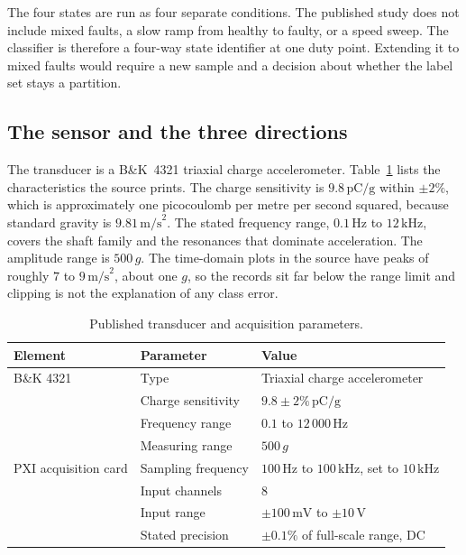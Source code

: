 The four states are run as four separate conditions.
The published study does not include mixed faults, a slow ramp from healthy to faulty, or a speed sweep.
The classifier is therefore a four-way state identifier at one duty point.
Extending it to mixed faults would require a new sample and a decision about whether the label set stays a partition.

\subsection{The sensor and the three directions}

The transducer is a B\&K~4321 triaxial charge accelerometer.
Table~\ref{tab:sensor} lists the characteristics the source prints.
The charge sensitivity is \(9.8\,\mathrm{pC/g}\) within \(\pm 2\%\), which is approximately one picocoulomb per metre per second squared, because standard gravity is \(9.81\,\mathrm{m/s}^{2}\).
The stated frequency range, \(0.1\,\mathrm{Hz}\) to \(12\,\mathrm{kHz}\), covers the shaft family and the resonances that dominate acceleration.
The amplitude range is \(500\,g\).
The time-domain plots in the source have peaks of roughly \(7\) to \(9\,\mathrm{m/s}^{2}\), about one \(g\), so the records sit far below the range limit and clipping is not the explanation of any class error.

\begin{table}[H]
\centering
\caption{Published transducer and acquisition parameters.}
\label{tab:sensor}
\begin{tabular}{lll}
\toprule
Element & Parameter & Value \\
\midrule
B\&K 4321 & Type & Triaxial charge accelerometer \\
 & Charge sensitivity & \(9.8\pm 2\%\,\mathrm{pC/g}\) \\
 & Frequency range & \(0.1\) to \(12\,000\,\mathrm{Hz}\) \\
 & Measuring range & \(500\,g\) \\
\midrule
PXI acquisition card & Sampling frequency & \(100\,\mathrm{Hz}\) to \(100\,\mathrm{kHz}\), set to \(10\,\mathrm{kHz}\) \\
 & Input channels & \(8\) \\
 & Input range & \(\pm 100\,\mathrm{mV}\) to \(\pm 10\,\mathrm{V}\) \\
 & Stated precision & \(\pm 0.1\%\) of full-scale range, DC \\
\bottomrule
\end{tabular}
\end{table}

